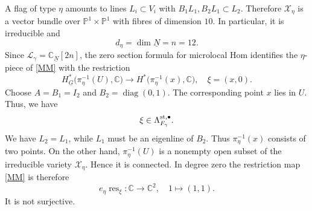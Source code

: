 \documentclass[11pt,reqno]{amsart}
\theoremstyle{definition}
\theoremstyle{remark}
\def\bbC{\mathbb C}
\def\dN{\underline N}
\def\dG{\underline G}
\def\scrX{\mathscr X}
\begin{document}
A flag of type $\eta$ amounts to lines $L_i\subset V_i$ with
$B_1L_1,B_2L_1\subset L_2$. Therefore $\scrX_\eta$ is a
vector bundle over $\mathbb P^1\times\mathbb P^1$ with fibres
of dimension $10$. In particular, it is  irreducible and 
$$d_\eta=\dim\dN=n=12.$$
Since $\mathscr L_\gamma=\bbC_{\dN}[2n]$, the zero section
formula for microlocal Hom identifies the $\eta$-piece of
\eqref{MM} with the restriction
\[
 H^*_{\dG}\bigl(\pi_\eta^{-1}(U),\bbC\bigr)
 \longrightarrow H^*\bigl(\pi_\eta^{-1}(x),\bbC\bigr),
 \quad \xi=(x,0).
\]
Choose $A=B_1=I_2$ and $B_2=\operatorname{diag}(0,1)$.
The corresponding point  $x$ lies in $U$.
Thus, we have $$\xi\in\Lambda_{F_\gamma}^{\rm st,\bullet}.$$
We have $L_2=L_1$, while $L_1$ must be an eigenline of $B_2$. 
Thus $\pi_\eta^{-1}(x)$ consists of two points.
On the other hand, $\pi_\eta^{-1}(U)$ is a nonempty open subset
of the irreducible variety $\scrX_\eta$. 
Hence it is connected.
In degree zero the restriction map \eqref{MM} is therefore
\[
 e_\eta\operatorname{res}_\xi:\bbC\longrightarrow\bbC^2,
 \quad 1\longmapsto(1,1).
\]
It is not surjective.
\end{document}
